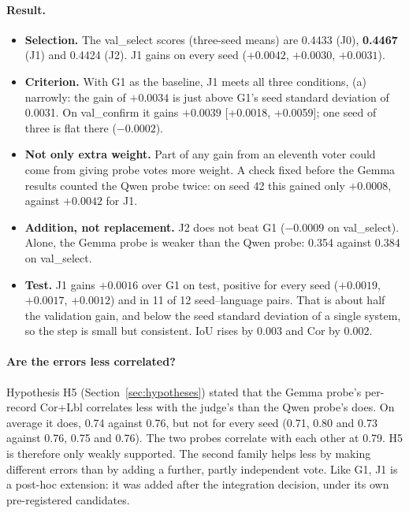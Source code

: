 \paragraph{Result.}
\begin{itemize}
    \item \textbf{Selection.} The val\_select scores (three-seed means) are 0.4433 (J0), \textbf{0.4467} (J1) and 0.4424 (J2). J1 gains on every seed ($+0.0042$, $+0.0030$, $+0.0031$).
    \item \textbf{Criterion.} With G1 as the baseline, J1 meets all three conditions, (a) narrowly: the gain of $+0.0034$ is just above G1's seed standard deviation of 0.0031. On val\_confirm it gains $+0.0039$ [+0.0018, +0.0059]; one seed of three is flat there ($-0.0002$).
    \item \textbf{Not only extra weight.} Part of any gain from an eleventh voter could come from giving probe votes more weight. A check fixed before the Gemma results counted the Qwen probe twice: on seed 42 this gained only $+0.0008$, against $+0.0042$ for J1.
    \item \textbf{Addition, not replacement.} J2 does not beat G1 ($-0.0009$ on val\_select). Alone, the Gemma probe is weaker than the Qwen probe: 0.354 against 0.384 on val\_select.
    \item \textbf{Test.} J1 gains $+0.0016$ over G1 on test, positive for every seed ($+0.0019$, $+0.0017$, $+0.0012$) and in 11 of 12 seed--language pairs. That is about half the validation gain, and below the seed standard deviation of a single system, so the step is small but consistent. IoU rises by 0.003 and Cor by 0.002.
\end{itemize}

\paragraph{Are the errors less correlated?}
Hypothesis H5 (Section~\ref{sec:hypotheses}) stated that the Gemma probe's per-record Cor+Lbl correlates less with the judge's than the Qwen probe's does. On average it does, 0.74 against 0.76, but not for every seed (0.71, 0.80 and 0.73 against 0.76, 0.75 and 0.76). The two probes correlate with each other at 0.79. H5 is therefore only weakly supported. The second family helps less by making different errors than by adding a further, partly independent vote. Like G1, J1 is a post-hoc extension: it was added after the integration decision, under its own pre-registered candidates.

